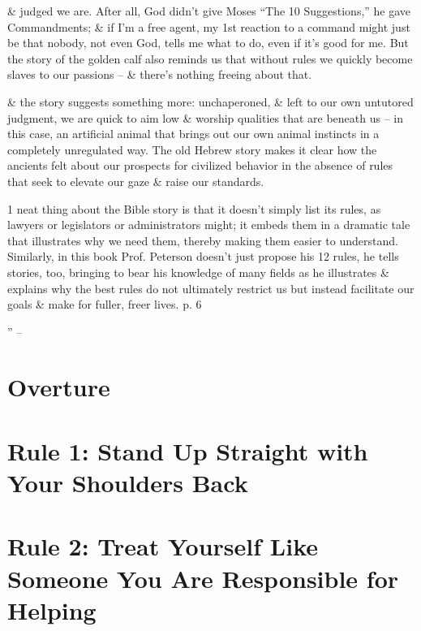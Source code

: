 \documentclass{article}
\numberwithin{equation}{section}
\begin{document}
\& judged we are. After all, God didn't give Moses ``The 10 Suggestions,'' he gave Commandments; \& if I'm a free agent, my 1st reaction to a command might just be that nobody, not even God, tells me what to do, even if it's good for me. But the story of the golden calf also reminds us that without rules we quickly become slaves to our passions -- \& there's nothing freeing about that.

\& the story suggests something more: unchaperoned, \& left to our own untutored judgment, we are quick to aim low \& worship qualities that are beneath us -- in this case, an artificial animal that brings out our own animal instincts in a completely unregulated way. The old Hebrew story makes it clear how the ancients felt about our prospects for civilized behavior in the absence of rules that seek to elevate our gaze \& raise our standards.

1 neat thing about the Bible story is that it doesn't simply list its rules, as lawyers or legislators or administrators might; it embeds them in a dramatic tale that illustrates why we need them, thereby making them easier to understand. Similarly, in this book Prof. Peterson doesn't just propose his 12 rules, he tells stories, too, bringing to bear his knowledge of many fields as he illustrates \& explains why the best rules do not ultimately restrict us but instead facilitate our goals \& make for fuller, freer lives. p. 6

'' -- \cite[pp. 5--]{Peterson2018}




\section{Overture}


\section{Rule 1: Stand Up Straight with Your Shoulders Back}


\section{Rule 2: Treat Yourself Like Someone You Are Responsible for Helping}
\end{document}
